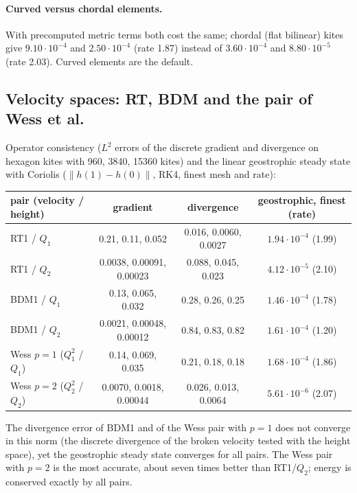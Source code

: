 \documentclass[11pt,a4paper]{article}
\begin{document}
\paragraph{Curved versus chordal elements.} With precomputed metric terms both
cost the same; chordal (flat bilinear) kites give $9.10\cdot10^{-4}$ and
$2.50\cdot10^{-4}$ (rate 1.87) instead of $3.60\cdot10^{-4}$ and
$8.80\cdot10^{-5}$ (rate 2.03). Curved elements are the default.

\subsection{Velocity spaces: RT, BDM and the pair of Wess et al.}
Operator consistency ($L^2$ errors of the discrete gradient and divergence on
hexagon kites with 960, 3840, 15360 kites) and the linear geostrophic steady state
with Coriolis ($\|h(1)-h(0)\|$, RK4, finest mesh and rate):
\begin{center}
\begin{tabular}{lccc}
\toprule
pair (velocity / height) & gradient & divergence & geostrophic, finest (rate) \\
\midrule
RT1 / $Q_1$            & 0.21, 0.11, 0.052     & 0.016, 0.0060, 0.0027 & $1.94\cdot10^{-4}$ (1.99) \\
RT1 / $Q_2$            & 0.0038, 0.00091, 0.00023 & 0.088, 0.045, 0.023 & $4.12\cdot10^{-5}$ (2.10) \\
BDM1 / $Q_1$           & 0.13, 0.065, 0.032    & 0.28, 0.26, 0.25      & $1.46\cdot10^{-4}$ (1.78) \\
BDM1 / $Q_2$           & 0.0021, 0.00048, 0.00012 & 0.84, 0.83, 0.82   & $1.61\cdot10^{-4}$ (1.20) \\
Wess $p=1$ ($Q_1^2$ / $Q_1$) & 0.14, 0.069, 0.035 & 0.21, 0.18, 0.18    & $1.68\cdot10^{-4}$ (1.86) \\
Wess $p=2$ ($Q_2^2$ / $Q_2$) & 0.0070, 0.0018, 0.00044 & 0.026, 0.013, 0.0064 & $5.61\cdot10^{-6}$ (2.07) \\
\bottomrule
\end{tabular}
\end{center}
The divergence error of BDM1 and of the Wess pair with $p=1$ does not converge in
this norm (the discrete divergence of the broken velocity tested with the height
space), yet the geostrophic steady state converges for all pairs. The Wess pair
with $p=2$ is the most accurate, about seven times better than RT1/$Q_2$; energy is
conserved exactly by all pairs.
\end{document}
